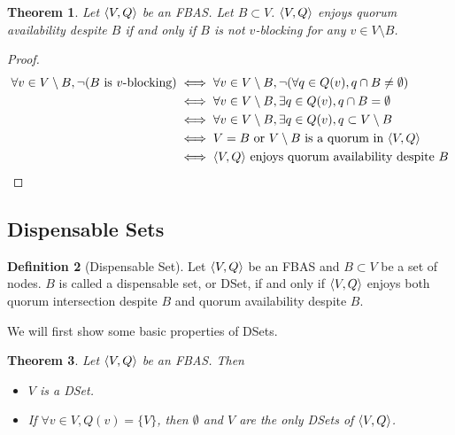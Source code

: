 \documentclass[12pt, psamsfonts]{amsart}
\newtheorem{thm}{Theorem}[subsection]
\theoremstyle{definition}
\newtheorem{defn}[thm]{Definition}
\theoremstyle{remark}
\numberwithin{equation}{subsection}
\begin{document}
\begin{thm}\label{quorum_availability_v_blocking}
    Let $\ev{V, Q}$ be an FBAS\@.
    Let $B \subset V$.
    $\ev{V, Q}$ enjoys quorum availability despite $B$ if and only if $B$ is not $v$-blocking for any $v \in V \setminus B$.
\end{thm}

\begin{proof}
    \begin{align*}
        \forall v \in V \setminus B, \neg(\text{$B$ is $v$-blocking})
            &\iff \forall v \in V \setminus B, \neg(\forall q \in Q(v), q \cap B \ne \emptyset) \\
            &\iff \forall v \in V \setminus B, \exists q \in Q(v), q \cap B = \emptyset \\
            &\iff \forall v \in V \setminus B, \exists q \in Q(v), q \subset V \setminus B \\
            &\iff \text{$V = B$ or $V \setminus B$ is a quorum in $\ev{V, Q}$} \\
            &\iff \text{$\ev{V, Q}$ enjoys quorum availability despite $B$}
    \end{align*}
\end{proof}

\newpage
\subsection{Dispensable Sets}

\begin{defn}[Dispensable Set]\label{def_dset}
    Let $\ev{V, Q}$ be an FBAS and $B \subset V$ be a set of nodes.
    $B$ is called a dispensable set, or DSet, if and only if $\ev{V, Q}$ enjoys both quorum intersection despite $B$ and quorum availability despite $B$.
\end{defn}

We will first show some basic properties of DSets.
\begin{thm}
    Let $\ev{V, Q}$ be an FBAS.
    Then
    \begin{itemize}
        \item
            $V$ is a DSet.
        \item
            If $\forall v \in V, Q(v) = \{ V \}$, then $\emptyset$ and $V$ are the only DSets of $\ev{V, Q}$.
    \end{itemize}
\end{thm}
\end{document}
